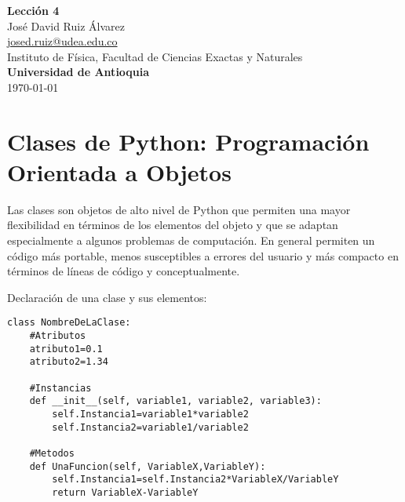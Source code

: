 \documentclass[10.5pt]{article}
\begin{document}
\noindent
\begin{minipage}[b]{0.75\linewidth}
{\LARGE\bf Lecci\'{o}n 4}\\ %
\large{Jos\'{e} David Ruiz \'{A}lvarez} \\
\small{\href{mailto:josed.ruiz@udea.edu.co}{josed.ruiz@udea.edu.co}} \\ %
\normalsize{Instituto de Física, Facultad de Ciencias Exactas y Naturales} \\%
\normalsize{\bf Universidad de Antioquia} \\[8mm]
\today %
\end{minipage}%



\section{Clases de Python: Programación Orientada a Objetos}

Las clases son objetos de alto nivel de Python que permiten una mayor flexibilidad en términos de los elementos del objeto y que se adaptan especialmente a algunos problemas de computación. En general permiten un código más portable, menos susceptibles a errores del usuario y más compacto en términos de líneas de código y conceptualmente.

Declaración de una clase y sus elementos:
\begin{verbatim}
class NombreDeLaClase:
    #Atributos
    atributo1=0.1
    atributo2=1.34

    #Instancias
    def __init__(self, variable1, variable2, variable3):
        self.Instancia1=variable1*variable2
        self.Instancia2=variable1/variable2

    #Metodos
    def UnaFuncion(self, VariableX,VariableY):
        self.Instancia1=self.Instancia2*VariableX/VariableY
        return VariableX-VariableY
\end{verbatim}
\end{document}
